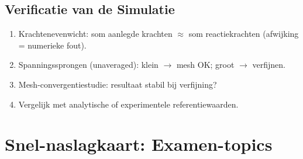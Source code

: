 \documentclass[a4paper,10pt]{article}
\begin{document}
\subsection*{Verificatie van de Simulatie}

\begin{enumerate}
  \item Krachtenevenwicht: som aanlegde krachten $\approx$ som reactiekrachten (afwijking = numerieke fout).
  \item Spanningssprongen (unaveraged): klein $\to$ mesh OK; groot $\to$ verfijnen.
  \item Mesh-convergentiestudie: resultaat stabil bij verfijning?
  \item Vergelijk met analytische of experimentele referentiewaarden.
\end{enumerate}

\section{Snel-naslagkaart: Examen-topics}\label{sec:snel}
\end{document}
